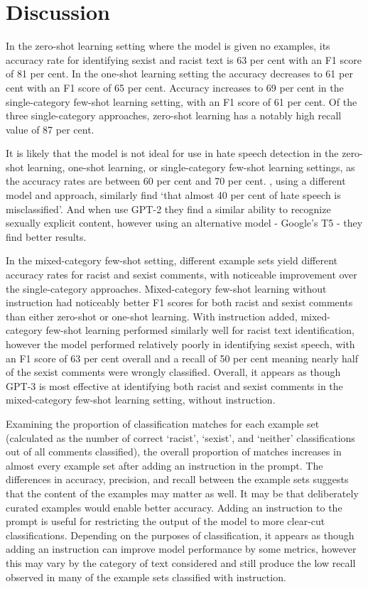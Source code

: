 \documentclass{bmcart}
\begin{document}
\section{Discussion}\label{discussion}

In the zero-shot learning setting where the model is given no examples, its accuracy rate for identifying sexist and racist text is 63 per cent with an F1 score of 81 per cent. In the one-shot learning setting the accuracy decreases to 61 per cent with an F1 score of 65 per cent. Accuracy increases to 69 per cent in the single-category few-shot learning setting, with an F1 score of 61 per cent. Of the three single-category approaches, zero-shot learning has a notably high recall value of 87 per cent.

It is likely that the model is not ideal for use in hate speech detection in the zero-shot learning, one-shot learning, or single-category few-shot learning settings, as the accuracy rates are between 60 per cent and 70 per cent. \cite{davidson2017automated}, using a different model and approach, similarly find `that almost 40 per cent of hate speech is misclassified'. And when \cite{schick2021selfdiagnosis} use GPT-2 they find a similar ability to recognize sexually explicit content, however using an alternative model - Google's T5 \cite{raffel2020exploring} - they find better results.

In the mixed-category few-shot setting, different example sets yield different accuracy rates for racist and sexist comments, with noticeable improvement over the single-category approaches. Mixed-category few-shot learning without instruction had noticeably better F1 scores for both racist and sexist comments than either zero-shot or one-shot learning. With instruction added, mixed-category few-shot learning performed similarly well for racist text identification, however the model performed relatively poorly in identifying sexist speech, with an F1 score of 63 per cent overall and a recall of 50 per cent meaning nearly half of the sexist comments were wrongly classified. Overall, it appears as though GPT-3 is most effective at identifying both racist and sexist comments in the mixed-category few-shot learning setting, without instruction.

Examining the proportion of classification matches for each example set (calculated as the number of correct `racist', `sexist', and `neither' classifications out of all comments classified), the overall proportion of matches increases in almost every example set after adding an instruction in the prompt. The differences in accuracy, precision, and recall between the example sets suggests that the content of the examples may matter as well. It may be that deliberately curated examples would enable better accuracy. Adding an instruction to the prompt is useful for restricting the output of the model to more clear-cut classifications. Depending on the purposes of classification, it appears as though adding an instruction can improve model performance by some metrics, however this may vary by the category of text considered and still produce the low recall observed in many of the example sets classified with instruction.
\end{document}
